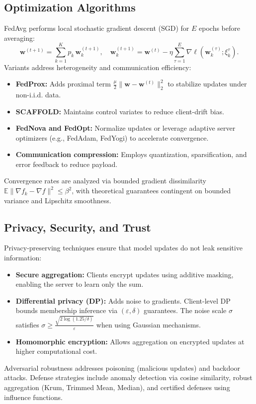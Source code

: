 \documentclass{article}
\begin{document}
\subsection{Optimization Algorithms}
FedAvg performs local stochastic gradient descent (SGD) for $E$ epochs before averaging:
\begin{equation}
  \mathbf{w}^{(t+1)} = \sum_{k=1}^{K} p_k \, \mathbf{w}_k^{(t+1)}, \quad \mathbf{w}_k^{(t+1)} = \mathbf{w}^{(t)} - \eta \sum_{\tau=1}^{E} \nabla \ell(\mathbf{w}_k^{(\tau)}; \xi_k^\tau).
\end{equation}
Variants address heterogeneity and communication efficiency:
\begin{itemize}
  \item \textbf{FedProx:} Adds proximal term $\frac{\mu}{2}\|\mathbf{w} - \mathbf{w}^{(t)}\|_2^2$ to stabilize updates under non-i.i.d. data.
  \item \textbf{SCAFFOLD:} Maintains control variates to reduce client-drift bias.
  \item \textbf{FedNova and FedOpt:} Normalize updates or leverage adaptive server optimizers (e.g., FedAdam, FedYogi) to accelerate convergence.
  \item \textbf{Communication compression:} Employs quantization, sparsification, and error feedback to reduce payload.
\end{itemize}
Convergence rates are analyzed via bounded gradient dissimilarity $\mathbb{E}\|\nabla f_k - \nabla f\|^2 \le \beta^2$, with theoretical guarantees contingent on bounded variance and Lipschitz smoothness.

\subsection{Privacy, Security, and Trust}
Privacy-preserving techniques ensure that model updates do not leak sensitive information:
\begin{itemize}
  \item \textbf{Secure aggregation:} Clients encrypt updates using additive masking, enabling the server to learn only the sum.
  \item \textbf{Differential privacy (DP):} Adds noise to gradients. Client-level DP bounds membership inference via $(\varepsilon, \delta)$ guarantees. The noise scale $\sigma$ satisfies $\sigma \ge \frac{\sqrt{2 \log(1.25/\delta)}}{\varepsilon}$ when using Gaussian mechanisms.
  \item \textbf{Homomorphic encryption:} Allows aggregation on encrypted updates at higher computational cost.
\end{itemize}
Adversarial robustness addresses poisoning (malicious updates) and backdoor attacks. Defense strategies include anomaly detection via cosine similarity, robust aggregation (Krum, Trimmed Mean, Median), and certified defenses using influence functions.
\end{document}
